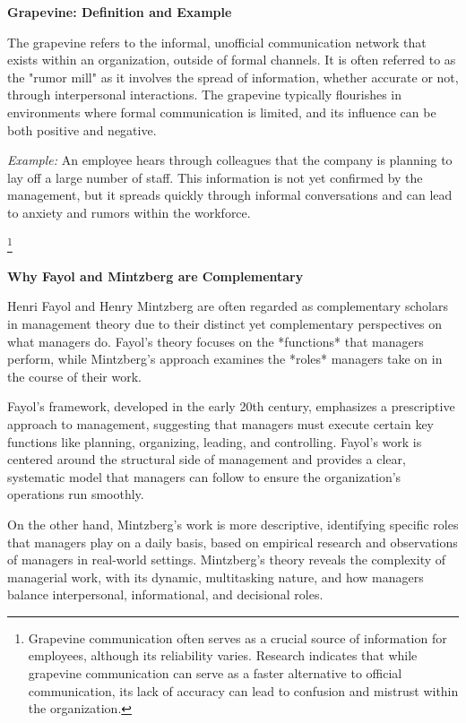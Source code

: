 \documentclass[10pt,a4paper]{book}
\begin{document}
\begin{multicols}{2}

\textbf{Grapevine: Definition and Example}

The grapevine refers to the informal, unofficial communication network that exists within an organization, outside of formal channels. It is often referred to as the "rumor mill" as it involves the spread of information, whether accurate or not, through interpersonal interactions. The grapevine typically flourishes in environments where formal communication is limited, and its influence can be both positive and negative. 

\textit{Example:} An employee hears through colleagues that the company is planning to lay off a large number of staff. This information is not yet confirmed by the management, but it spreads quickly through informal conversations and can lead to anxiety and rumors within the workforce.

\footnote{Grapevine communication often serves as a crucial source of information for employees, although its reliability varies. Research indicates that while grapevine communication can serve as a faster alternative to official communication, its lack of accuracy can lead to confusion and mistrust within the organization.}

\vspace{1cm}

\textbf{Why Fayol and Mintzberg are Complementary}

Henri Fayol and Henry Mintzberg are often regarded as complementary scholars in management theory due to their distinct yet complementary perspectives on what managers do. Fayol's theory focuses on the *functions* that managers perform, while Mintzberg’s approach examines the *roles* managers take on in the course of their work.

Fayol's framework, developed in the early 20th century, emphasizes a prescriptive approach to management, suggesting that managers must execute certain key functions like planning, organizing, leading, and controlling. Fayol’s work is centered around the structural side of management and provides a clear, systematic model that managers can follow to ensure the organization’s operations run smoothly.

On the other hand, Mintzberg’s work is more descriptive, identifying specific roles that managers play on a daily basis, based on empirical research and observations of managers in real-world settings. Mintzberg’s theory reveals the complexity of managerial work, with its dynamic, multitasking nature, and how managers balance interpersonal, informational, and decisional roles.


\end{multicols}
\end{document}
